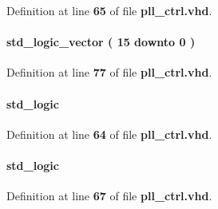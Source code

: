 Definition at line {\bf 65} of file {\bf pll\+\_\+ctrl.\+vhd}.

\paragraph[{c0\+\_\+cnt}]{ {\bfseries \textcolor{comment}{std\+\_\+logic\+\_\+vector}\textcolor{vhdlchar}{ }\textcolor{vhdlchar}{(}\textcolor{vhdlchar}{ }\textcolor{vhdlchar}{ } \textcolor{vhdldigit}{15} \textcolor{vhdlchar}{ }\textcolor{keywordflow}{downto}\textcolor{vhdlchar}{ }\textcolor{vhdlchar}{ } \textcolor{vhdldigit}{0} \textcolor{vhdlchar}{ }\textcolor{vhdlchar}{)}\textcolor{vhdlchar}{ }} \hspace{0.3cm}{\ttfamily [Signal]}}\label{classpll__ctrl_1_1arch_adf61dd781fe29b65462ce779c7cbaf92}


Definition at line {\bf 77} of file {\bf pll\+\_\+ctrl.\+vhd}.

\paragraph[{c0\+\_\+odddiv}]{ {\bfseries \textcolor{comment}{std\+\_\+logic}\textcolor{vhdlchar}{ }} \hspace{0.3cm}{\ttfamily [Signal]}}\label{classpll__ctrl_1_1arch_a6e24df4843165b89e5ddce2757f79f5d}


Definition at line {\bf 64} of file {\bf pll\+\_\+ctrl.\+vhd}.

\paragraph[{c1\+\_\+byp}]{ {\bfseries \textcolor{comment}{std\+\_\+logic}\textcolor{vhdlchar}{ }} \hspace{0.3cm}{\ttfamily [Signal]}}\label{classpll__ctrl_1_1arch_a926c50c193398f6c4a84af62130cbcb5}


Definition at line {\bf 67} of file {\bf pll\+\_\+ctrl.\+vhd}.

